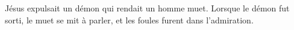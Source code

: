 \encetemps Jésus expulsait un démon qui rendait un homme muet.
Lorsque le démon fut sorti, le muet se mit à parler,
	et les foules furent dans l’admiration.
